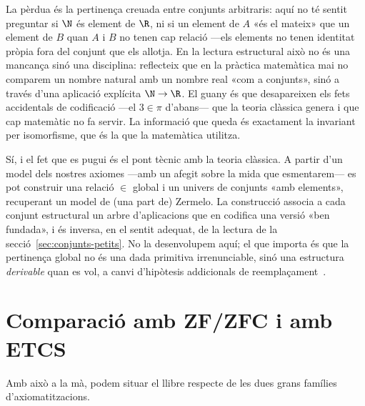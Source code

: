 \begin{observacio}\label{obs:pertinenca-local}
La pèrdua és la pertinença creuada entre conjunts arbitraris: aquí no té
sentit preguntar si \(\N\) és element de \(\R\), ni si un element de \(A\)
«és el mateix» que un element de \(B\) quan \(A\) i \(B\) no tenen cap
relació ---els elements no tenen identitat pròpia fora del conjunt que els
allotja. En la lectura estructural això no és una mancança sinó una
disciplina: reflecteix que en la pràctica matemàtica mai no comparem un
nombre natural amb un nombre real «com a conjunts», sinó a través d'una
aplicació explícita \(\N\to\R\). El guany és que desapareixen els fets
accidentals de codificació ---el \(3\in\pi\) d'abans--- que la teoria
clàssica genera i que cap matemàtic no fa servir. La informació que queda
és exactament la invariant per isomorfisme, que és la que la matemàtica
utilitza.
\end{observacio}

\begin{observacio}\label{obs:recuperar-in}
Sí, i el fet que es pugui és el pont tècnic amb la teoria clàssica. A
partir d'un model dels nostres axiomes ---amb un afegit sobre la mida que
esmentarem--- es pot construir una relació \(\in\) global i un univers de
conjunts «amb elements», recuperant un model de (una part de) Zermelo. La
construcció associa a cada conjunt estructural un arbre d'aplicacions que
en codifica una versió «ben fundada», i és inversa, en el sentit adequat,
de la lectura de la secció~\ref{sec:conjunts-petits}. No la desenvolupem
aquí; el que importa és que la pertinença global no és una dada primitiva
irrenunciable, sinó una estructura \emph{derivable} quan es vol, a canvi
d'hipòtesis addicionals de reemplaçament~\cite{mclarty-catset,shulman-comparing}.
\end{observacio}

\section{Comparació amb ZF/ZFC i amb ETCS}\label{sec:comparacio}

Amb això a la mà, podem situar el llibre respecte de les dues grans
famílies d'axiomatitzacions.

